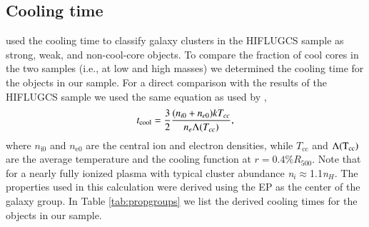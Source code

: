 \documentclass{aa} %
\begin{document}
\subsection{Cooling time}
\cite{2010A&A...513A..37H} used the cooling time to classify galaxy
clusters in the HIFLUGCS sample as strong, weak, and non-cool-core
objects.  To
compare the fraction of cool cores in the two samples (i.e., at low and
high masses) we determined the cooling time for the objects in our
sample. For a direct comparison with the results of the HIFLUGCS
sample we used the same equation as used by \cite{2010A&A...513A..37H},
\begin{equation}
t_{\rm {cool}}=\frac{3}{2}\frac{(n_{i0}+n_{e0})kT_{cc}}{n_e\Lambda(T_{cc})},
\end{equation}
where $n_{\text{i0}}$ and $n_{\text{e0}}$ are the central ion and electron
densities, while $T_{\text{cc}}$ and $\Lambda({\rm {T_{cc}}})$ are the average
temperature and the cooling function at $r=0.4\%R_{\text{500}}$. Note that
for a nearly fully ionized plasma with typical cluster abundance {\it n$_i$}$\approx$1.1{\it n$_H$}. The properties used in
this calculation were derived using the EP as the center of the
galaxy group. In Table \ref{tab:propgroups} we list the derived cooling
times for the objects in our sample.
\end{document}
